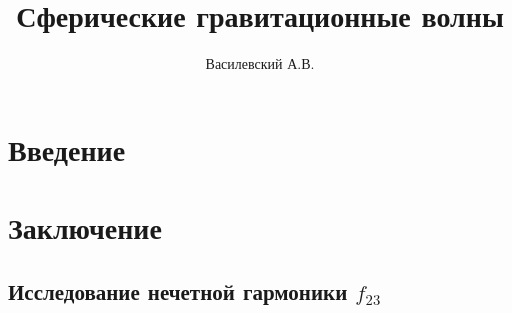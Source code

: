 \documentclass[12pt,a4paper]{article}
\title{Сферические гравитационные волны}
\author{Василевский А.В.}
\begin{document}
    \makedocroot

    \maketitle
    \tableofcontents

    \section{Введение}
    

    \section{Заключение}
    

    \begin{appendix}

        \section{Исследование нечетной гармоники $f_{23}$}
        

    \end{appendix}
\end{document}

